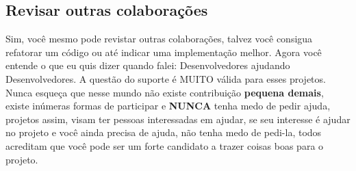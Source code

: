 \documentclass[a4paper,11pt]{article}
\begin{document}
\subsection{Revisar outras colaborações}
Sim, você mesmo pode revistar outras colaborações, talvez você consigua refatorar um código ou até indicar uma implementação melhor. Agora você entende o que eu quis dizer quando falei: Desenvolvedores ajudando Desenvolvedores. A questão do suporte é MUITO válida para esses projetos.\newline\newline
Nunca esqueça que nesse mundo não existe contribuição \textbf{pequena demais}, existe inúmeras formas de participar e \textbf{NUNCA} tenha medo de pedir ajuda, projetos assim, visam ter pessoas interessadas em ajudar, se seu interesse é ajudar no projeto e você ainda precisa de ajuda, não tenha medo de pedi-la, todos acreditam que você pode ser um forte candidato a trazer coisas boas para o projeto.
\end{document}
